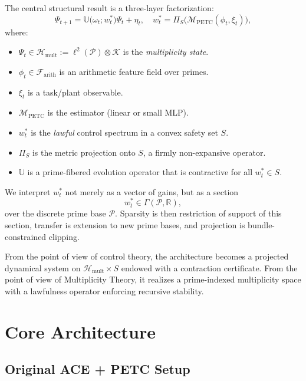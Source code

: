 \documentclass[11pt]{article}
\begin{document}
The central structural result is a three-layer factorization:
\[
\Psi_{t+1}
= \mathbb U\bigl(\omega_t; w_t^\ast\bigr)\Psi_t + \eta_t,\quad
w_t^\ast = \Pi_S\bigl(\mathcal M_{\mathrm{PETC}}(\phi_t, \xi_t)\bigr),
\]
where:
\begin{itemize}
  \item $\Psi_t \in \mathcal H_{\mathrm{mult}} := \ell^2(\mathcal P)\otimes\mathcal K$ is the \emph{multiplicity state}.
  \item $\phi_t \in \mathcal F_{\mathrm{arith}}$ is an arithmetic feature field over primes.
  \item $\xi_t$ is a task/plant observable.
  \item $\mathcal M_{\mathrm{PETC}}$ is the estimator (linear or small MLP).
  \item $w_t^\ast$ is the \emph{lawful} control spectrum in a convex safety set $S$.
  \item $\Pi_S$ is the metric projection onto $S$, a firmly non-expansive operator.
  \item $\mathbb U$ is a prime-fibered evolution operator that is contractive for all $w_t^\ast\in S$.
\end{itemize}

We interpret $w_t^\ast$ not merely as a vector of gains, but as a section
\[
w_t^\ast \in \Gamma(\mathcal P,\mathbb R),
\]
over the discrete prime base $\mathcal P$. Sparsity is then restriction of support of this section, transfer is extension to new prime bases, and projection is bundle-constrained clipping.

From the point of view of control theory, the architecture becomes a projected dynamical system on $\mathcal H_{\mathrm{mult}}\times S$ endowed with a contraction certificate. From the point of view of Multiplicity Theory, it realizes a prime-indexed multiplicity space with a lawfulness operator enforcing recursive stability.

\section{Core Architecture}

\subsection{Original ACE + PETC Setup}
\end{document}
